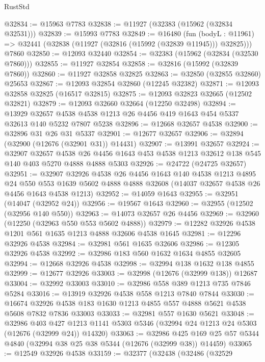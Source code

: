 \begin{lexlean}{RustStd}
\begin{coremodule}
@32834 := @15963 @7783
@32838 := @11927 (@32383 (@15962 (@32834 @32531)))
@32839 := @15993 @7783
@32849 := @16480
    (fun (bodyL : @11961) => @32441 (@32838 (@11927 (@32816 (@15992 (@32839 @11945))) @32825)))
    @7860
@32850 := @12093 @32440
@32854 := @32383 (@15962 (@32834 (@32530 @7860)))
@32855 := @11927 @32854
@32858 := @32816 (@15992 (@32839 @7860))
@32860 := @11927 @32858 @32825
@32863 := @32850 (@32855 @32860) @25653
@32867 := @12093 @32854 @32860 (@12245 @32382)
@32871 := @12093 @32858 @32825 (@16517 @32815)
@32875 := @12093 @32823 @32665 (@12502 @32821)
@32879 := @12093 @32660 @32664 (@12250 @32498)
@32894 := @13929
    @32657
    @4538
    @4538
    @1213
    @26
    @4456
    @419
    @1643
    @454
    @5337
    @32613
    @140
    @5232
    @7807
    @5238
@32896 := @12668 @32657 @4538
@32900 := @32896 @31 @26 @31 @5337
@32901 := @12677 @32657
@32906 := @32894 (@32900 (@12676 (@32901 @31)) @14431)
@32907 := @13991 @32657
@32924 := @32907
    @32657
    @4538
    @26
    @4456
    @1643
    @453
    @4538
    @1213
    @32612
    @138
    @545
    @140
    @403
    @5270
    @4888
    @4888
    @5303
@32926 := @24722 (@24725 @32657)
@32951 := @32907
    @32926
    @4538
    @26
    @4456
    @1643
    @140
    @4538
    @1213
    @4895
    @24
    @550
    @553
    @1639
    @5602
    @4888
    @4888
    @32608
    (@14037 @32657 @4538 @26 @4456 @1643 @4538 @1213)
@32952 := @14059 @1643
@32955 := @32951 (@14047 (@32952 @24))
@32956 := @19567 @1643
@32960 := @32955 (@12502 (@32956 @140 @550))
@32963 := @14073 @32657 @26 @4456
@32969 := @32960 (@12250 (@32963 @550 @553 @5602 @4888))
@32979 := @12282 @32926 @4538 @1201 @561 @1635 @1213 @4888 @32606 @4538 @1645
@32981 := @12296 @32926 @4538
@32984 := @32981 @561 @1635 @32606
@32986 := @12305 @32926 @4538
@32992 := @32986 @183 @560 @1632 @1634 @4855 @32605
@32994 := @12668 @32926 @4538
@32998 := @32994 @138 @1632 @138 @4855
@32999 := @12677 @32926
@33003 := @32998 (@12676 (@32999 @138)) @12687
@33004 := @32992 @33003
@33010 := @32986 @558 @389 @1213 @735 @7846 @5284
@33016 := @13919 @32926 @4538 @558 @1213 @7840 @7844
@33030 := @16674 @32926 @4538 @183 @1630 @1213 @4855 @557 @4888 @5621 @4538 @5608 @7832 @7836 @33003
@33033 := @32981 @557 @1630 @5621
@33048 := @32986
    @403
    @427
    @1213
    @1141
    @5303
    @5346
    (@32994 @24 @1213 @24 @5303 (@12676 (@32999 @24)) @14320)
@33063 := @32986
    @425
    @169
    @25
    @57
    @5344
    @4840
    (@32994 @38 @25 @38 @5344 (@12676 (@32999 @38)) @14459)
@33065 := @12549 @32926 @4538
@33159 := @32377
    (@32438
      (@32486
        (@32529

\end{coremodule}
\end{lexlean}
